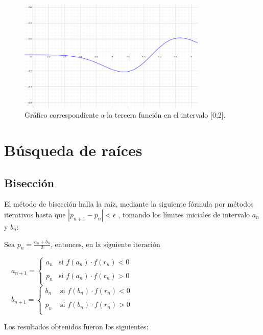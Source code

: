 \documentclass[titlepage,a4paper]{article}
\begin{document}
\begin{figure}[H]
\centering
\includegraphics[width=0.8\textwidth]{funcion3.png}
\caption{\label{fig:class01}Gráfico correspondiente a la tercera función en el intervalo [0;2].}
\end{figure}

\section{Búsqueda de raíces}\label{sec:busqueda_raices}

\subsection{Bisección}\label{sec:biseccion}
El método de bisección halla la raíz, mediante la siguiente fórmula por métodos iterativos hasta que 
$ |p_{n+1} - p_{n}| < \mbox{$\epsilon$} $ , tomando los límites iniciales de intervalo ${a_n}$ y ${b_n}$:

\smallskip

$\mbox{Sea }p_n = \frac{a_n+b_n}{2}\mbox{, entonces, en la siguiente iteración}$
\begin{center}
    $
    \quad a_{n+1} =\left\{ \begin{array}{lcc}
                 a_n & \mbox{si } f(a_n)\cdot f(r_n) <0 \\
                 \\ p_n & \mbox{si } f(a_n)\cdot f(r_n) > 0 \\
                 \end{array}
       \right. 
    $
    $
    \quad b_{n+1} =\left\{ \begin{array}{lcc}
                 b_n & \mbox{ si } f(b_n)\cdot f(r_n) < 0 \\
                 \\p_n & \mbox{ si } f(b_n)\cdot f(r_n) > 0 \\
                 \end{array}
       \right.
    $
\end{center}
\smallskip
Los resultados obtenidos fueron los siguientes:
\end{document}

